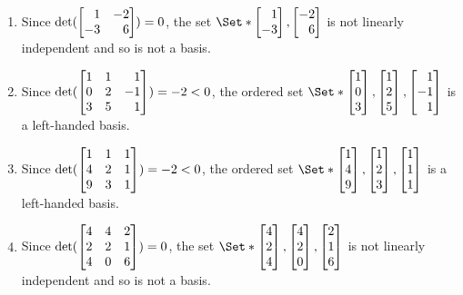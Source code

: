 \begin{exercises}
\begin{problist}
\begin{solution}
\begin{enumerate}
				\item Since $\det(\mat{1 & -2 \\ -3 & 6})=0$, the set
					$\Set*{\mat{1 \\ -3},\mat{-2 \\ 6}}$ is not linearly
					independent and so is not a basis.

				\item Since $\det(\mat{1 & 1 & 1 \\ 0 & 2 & -1 \\ 3 & 5 & 1})=-2<
					0$, the ordered set
					$\Set*{\mat{1 \\ 0 \\ 3},\mat{1 \\ 2 \\ 5},\mat{1 \\ -1 \\ 1}}$
					is a left-handed basis.

				\item Since $\det(\mat{1 & 1 & 1 \\ 4 & 2 & 1 \\ 9 & 3 & 1})=-2<0$,
					the ordered set
					$\Set*{\mat{1 \\ 4 \\ 9},\mat{1 \\ 2 \\ 3},\mat{1 \\ 1 \\ 1}}$
					is a left-handed basis.

				\item Since $\det(\mat{4 & 4 & 2 \\ 2 & 2 & 1 \\ 4 & 0 & 6})=0$,
					the set
					$\Set*{\mat{4 \\ 2 \\ 4},\mat{4 \\ 2 \\ 0},\mat{2 \\ 1 \\ 6}}$
					is not linearly independent and so is not a basis.
			\end{enumerate}
		\end{solution}


\end{problist}
\end{exercises}
